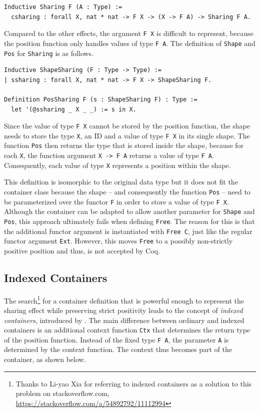 \documentclass[a4paper, 11pt, fleqn, twoside, abstract=on]{scrreprt}
\newcommand{\hinl}[1]{\texttt{#1}}
\newcommand{\cinl}[1]{\texttt{#1}}
\begin{document}
\begin{verbatim}
Inductive Sharing F (A : Type) :=
  csharing : forall X, nat * nat -> F X -> (X -> F A) -> Sharing F A.
\end{verbatim}
\noindent
Compared to the other effects, the argument \hinl{F X} is difficult to represent, because the position function only handles values of type \hinl{F A}.
The definition of \cinl{Shape} and \cinl{Pos} for \cinl{Sharing} is as follows.

\begin{verbatim}
Inductive ShapeSharing (F : Type -> Type) :=
| ssharing : forall X, nat * nat -> F X -> ShapeSharing F.

Definition PosSharing F (s : ShapeSharing F) : Type :=
  let '(@ssharing _ X _ _) := s in X.
\end{verbatim}
\noindent
Since the value of type \cinl{F X} cannot be stored by the position function, the shape needs to store the type \hinl{X}, an ID and a value of type \hinl{F X} in its single shape.
The function \cinl{Pos} then returns the type that is stored inside the shape, because for each \hinl{X}, the function argument \hinl{X -> F A} returns a value of type \hinl{F A}.
Consequently, each value of type \cinl{X} represents a position within the shape.

This definition is isomorphic to the original data type but it does not fit the container class because the shape -- and consequently the function \cinl{Pos} -- need to be parameterized over the functor \hinl{F} in order to store a value of type \hinl{F X}.
Although the container can be adapted to allow another parameter for \cinl{Shape} and \cinl{Pos}, this approach ultimately fails when defining \cinl{Free}.
The reason for this is that the additional functor argument is instantiated with \cinl{Free C}, just like the regular functor argument \cinl{Ext}.
However, this moves \cinl{Free} to a possibly non-strictly positive position and thus, is not accepted by Coq.

\subsection{Indexed Containers}
The search\footnote{Thanks to Li-yao Xia for referring to indexed containers as a solution to this problem on stackoverflow.com, \url{https://stackoverflow.com/a/54892792/11112994}} for a container definition that is powerful enough to represent the sharing effect while preserving strict positivity leads to the concept of \textit{indexed containers}, introduced by \citet{altenkirch2009indexed}. 
The main difference between ordinary and indexed containers is an additional context function \cinl{Ctx} that determines the return type of the position function.
Instead of the fixed type \hinl{F A}, the parameter \cinl{A} is determined by the context function.
The context thus becomes part of the container, as shown below.
\end{document}
